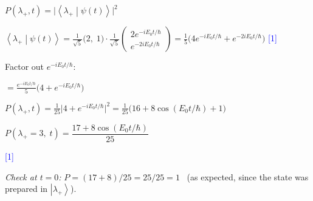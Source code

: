 \documentclass[12pt,a4paper]{article}
\newcommand{\markstep}[1]{\hfill\textcolor{blue}{[#1]}}
\newcommand{\finalanswer}[1]{%
  \begin{tcolorbox}[colback=green!5!white,colframe=green!50!black,boxrule=0.5pt]
  #1
  \end{tcolorbox}
}
\renewcommand{\ket}[1]{\left|#1\right\rangle}
\renewcommand{\braket}[2]{\left\langle #1\middle|#2\right\rangle}
\begin{document}
\begin{parts}
$P(\lambda_+, t) = \bigl|\braket{\lambda_+}{\psi(t)}\bigr|^2$

$\braket{\lambda_+}{\psi(t)} = \frac{1}{\sqrt{5}}\bigl(2,\;1\bigr)\cdot\frac{1}{\sqrt{5}}\begin{pmatrix}2e^{-iE_0 t/\hbar}\\ e^{-2iE_0 t/\hbar}\end{pmatrix} = \frac{1}{5}\bigl(4e^{-iE_0 t/\hbar} + e^{-2iE_0 t/\hbar}\bigr)$ \markstep{1}

Factor out $e^{-iE_0 t/\hbar}$:

$= \frac{e^{-iE_0 t/\hbar}}{5}\bigl(4 + e^{-iE_0 t/\hbar}\bigr)$

$P(\lambda_+, t) = \frac{1}{25}\bigl|4 + e^{-iE_0 t/\hbar}\bigr|^2 = \frac{1}{25}\bigl(16 + 8\cos(E_0 t/\hbar) + 1\bigr)$

\finalanswer{$P(\lambda_+ = 3,\;t) = \dfrac{17 + 8\cos(E_0 t/\hbar)}{25}$} \markstep{1}

\textit{Check at $t = 0$:} $P = (17 + 8)/25 = 25/25 = 1$ \checkmark\ (as expected, since the state was prepared in $\ket{\lambda_+}$).

\end{parts}
\end{document}
